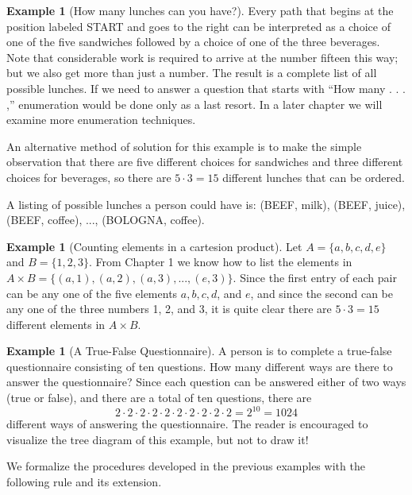 \documentclass[10pt,]{book}
\theoremstyle{plain}
\theoremstyle{definition}
\newtheorem{example}[theorem]{Example}
\begin{document}
\begin{example}[How many lunches can you have?]
%
\par

 Every path that begins at the position labeled START and goes to the right can be interpreted as a choice of one of the five sandwiches followed by a choice of one of the three beverages. Note that considerable work is required to arrive at the number fifteen this way; but we also get more than just a number. The result is a complete list of all possible lunches. If we need to answer a question that starts with ``How many . . . ,'' enumeration would be done only as a last resort. In a later chapter we will examine more enumeration techniques.
%
\par

 An alternative method of solution for this example is to make the simple observation that there are five different choices for sandwiches and three different choices for beverages, so there are \(5 \cdot 3 = 15\) different lunches that can be ordered.
%
\par

 A listing of possible lunches a person could have is: {(BEEF, milk), (BEEF, juice), (BEEF, coffee), ..., (BOLOGNA, coffee)}.
%
\end{example}
\begin{example}[Counting elements in a cartesion product]\label{cartesian-cardinality}
Let \(A = \{a, b, c, d, e\}\) and \(B = \{1,2,3\}\). From Chapter 1 we know how to list the elements in \(A \times B = \{(a, 1), (a, 2), (a, 3), ..., (e, 3)\}\).  Since the first entry of each pair can be any one of the five elements \(a, b, c, d\), and \(e\), and since the second can be any one of the three numbers 1, 2, and 3, it is quite clear there are 
\(5 \cdot 3 = 15\) different elements in \(A \times B\).
%
\end{example}
\begin{example}[A True-False Questionnaire]\label{questionnaire}
A person is to complete a true-false questionnaire consisting of ten questions. How many different ways are there to answer the questionnaire? Since each question can be answered either of two ways (true or false), and there are a total of ten questions, there are \[ 2 \cdot 2 \cdot 2 \cdot 2 \cdot 2 \cdot 2 \cdot 2 \cdot 2 \cdot 2 \cdot 2 = 2^{10} = 1024\] different ways of answering the questionnaire. The reader is encouraged to visualize the tree diagram of this example, but not to draw it!%
\end{example}
\par

 We formalize the procedures developed in the previous examples with the following rule and its extension.
%
\typeout{************************************************}
\typeout{************************************************}
\end{document}
